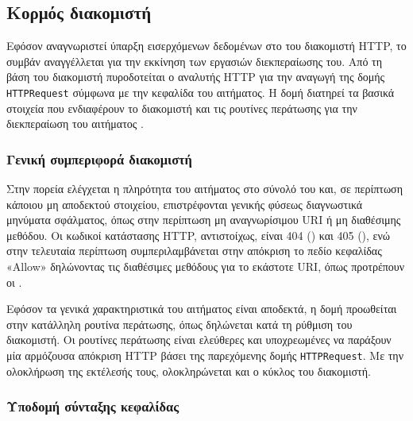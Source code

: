 \subsection{Κορμός διακομιστή}
\label{subsec:network:server-base}

Εφόσον αναγνωριστεί ύπαρξη εισερχόμενων δεδομένων στο  του διακομιστή
HTTP, το συμβάν αναγγέλλεται για την εκκίνηση των εργασιών διεκπεραίωσης του.
Από τη βάση του διακομιστή πυροδοτείται ο αναλυτής HTTP για την αναγωγή της
δομής \verb~HTTPRequest~ σύμφωνα με την κεφαλίδα του αιτήματος.
Η δομή διατηρεί τα βασικά στοιχεία που ενδιαφέρουν το διακομιστή και τις
ρουτίνες περάτωσης για την διεκπεραίωση του αιτήματος%
.


\subsubsection{Γενική συμπεριφορά διακομιστή}

Στην πορεία ελέγχεται η πληρότητα του αιτήματος στο σύνολό του και, σε περίπτωση
κάποιου μη αποδεκτού στοιχείου, επιστρέφονται γενικής φύσεως διαγνωστικά
μηνύματα σφάλματος, όπως στην περίπτωση μη αναγνωρίσιμου URI ή μη διαθέσιμης
μεθόδου. Οι κωδικοί κατάστασης HTTP, αντιστοίχως, είναι 404 () και
405 (), ενώ στην τελευταία περίπτωση συμπεριλαμβάνεται
στην απόκριση το πεδίο κεφαλίδας «Allow» δηλώνοντας τις διαθέσιμες μεθόδους για
το εκάστοτε URI, όπως προτρέπουν οι \textcite[66]{rfc2616}.

Εφόσον τα γενικά χαρακτηριστικά του αιτήματος είναι αποδεκτά, η δομή προωθείται
στην κατάλληλη ρουτίνα περάτωσης, όπως δηλώνεται κατά τη ρύθμιση του διακομιστή.
Οι ρουτίνες περάτωσης είναι ελεύθερες και υποχρεωμένες να παράξουν μία
αρμόζουσα απόκριση HTTP βάσει της παρεχόμενης δομής \verb~HTTPRequest~.
Με την ολοκλήρωση της εκτέλεσής τους, ολοκληρώνεται και ο κύκλος του διακομιστή.


\subsubsection{Υποδομή σύνταξης κεφαλίδας}
\label{ssubsec:network:header-compile}

